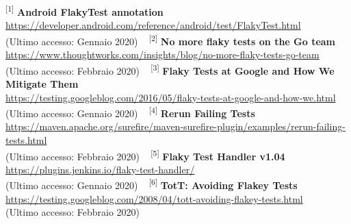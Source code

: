 \fancyhead[C]{}
\textsuperscript{[1]} \textbf{Android FlakyTest annotation}\\
\url{https://developer.android.com/reference/android/test/FlakyTest.html}\\
(Ultimo accesso: Gennaio 2020)
\newline~\newline
\textsuperscript{[2]} \textbf{No more flaky tests on the Go team}\\
\url{https://www.thoughtworks.com/insights/blog/no-more-flaky-tests-go-team}\\
(Ultimo accesso: Febbraio 2020)
\newline~\newline
\textsuperscript{[3]} \textbf{Flaky Tests at Google and How We Mitigate Them}\\
\url{https://testing.googleblog.com/2016/05/flaky-tests-at-google-and-how-we.html}\\
(Ultimo accesso: Gennaio 2020)
\newline~\newline
\textsuperscript{[4]} \textbf{Rerun Failing Tests}\\
\url{https://maven.apache.org/surefire/maven-surefire-plugin/examples/rerun-failing-tests.html}\\
(Ultimo accesso: Febbraio 2020)
\newline~\newline
\textsuperscript{[5]} \textbf{Flaky Test Handler v1.04}\\
\url{https://plugins.jenkins.io/flaky-test-handler/}\\
(Ultimo accesso: Gennaio 2020)
\newline~\newline
\textsuperscript{[6]} \textbf{TotT: Avoiding Flakey Tests}\\
\url{https://testing.googleblog.com/2008/04/tott-avoiding-flakey-tests.html}\\
(Ultimo accesso: Febbraio 2020)
\\
